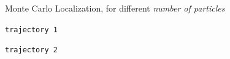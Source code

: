 \documentclass[letterpaper, 10pt, conference]{ieeeconf}
\begin{document}
\begin{figure}
\vspace{.3em}

\begin{center}
Monte Carlo Localization, for different \emph{number of particles}
\end{center}
\begin{minipage}{3.3in}
\begin{center}
\texttt{trajectory~1}
\end{center}
\end{minipage}
\hfill
\begin{minipage}{3.3in}
\begin{center}
\texttt{trajectory~2}
\end{center}
\end{minipage}

\vspace{.3em}


\end{figure}
\end{document}
